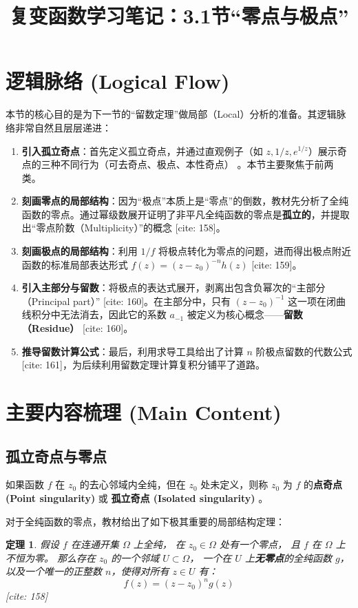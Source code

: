 \documentclass[UTF8]{ctexart}
\title{复变函数学习笔记：3.1节“零点与极点”}
\date{}
\newtheorem{theorem}{定理}[section]
\numberwithin{equation}{section}
\begin{document}
\maketitle

\section{逻辑脉络 (Logical Flow)}
本节的核心目的是为下一节的“留数定理”做局部（Local）分析的准备。其逻辑脉络非常自然且层层递进：
\begin{enumerate}
    \item \textbf{引入孤立奇点}：首先定义孤立奇点，并通过直观例子（如 $z, 1/z, e^{1/z}$）展示奇点的三种不同行为（可去奇点、极点、本性奇点） 。本节主要聚焦于前两类。
    \item \textbf{刻画零点的局部结构}：因为“极点”本质上是“零点”的倒数，教材先分析了全纯函数的零点。通过幂级数展开证明了非平凡全纯函数的零点是\textbf{孤立的}，并提取出“零点阶数（Multiplicity）”的概念 [cite: 158]。
    \item \textbf{刻画极点的局部结构}：利用 $1/f$ 将极点转化为零点的问题，进而得出极点附近函数的标准局部表达形式 $f(z) = (z-z_0)^{-n}h(z)$ [cite: 159]。
    \item \textbf{引入主部分与留数}：将极点的表达式展开，剥离出包含负幂次的“主部分（Principal part）” [cite: 160]。在主部分中，只有 $(z-z_0)^{-1}$ 这一项在闭曲线积分中无法消去，因此它的系数 $a_{-1}$ 被定义为核心概念——\textbf{留数（Residue）} [cite: 160]。
    \item \textbf{推导留数计算公式}：最后，利用求导工具给出了计算 $n$ 阶极点留数的代数公式 [cite: 161]，为后续利用留数定理计算复积分铺平了道路。
\end{enumerate}

\section{主要内容梳理 (Main Content)}

\subsection{孤立奇点与零点}
如果函数 $f$ 在 $z_0$ 的去心邻域内全纯，但在 $z_0$ 处未定义，则称 $z_0$ 为 $f$ 的\textbf{点奇点 (Point singularity)} 或 \textbf{孤立奇点 (Isolated singularity)} 。

对于全纯函数的零点，教材给出了如下极其重要的局部结构定理：

\begin{theorem}
假设 $f$ 在连通开集 $\Omega$ 上全纯，
在 $z_0 \in \Omega$ 处有一个零点，
且 $f$ 在 $\Omega$ 上不恒为零。
那么存在 $z_0$ 的一个邻域 $U \subset \Omega$，
一个在 $U$ 上\textbf{无零点}的全纯函数 $g$，以及一个唯一的正整数 $n$，使得对所有 $z \in U$ 有：
$$ f(z) = (z-z_0)^n g(z) $$ [cite: 158]
\end{theorem}
\end{document}
